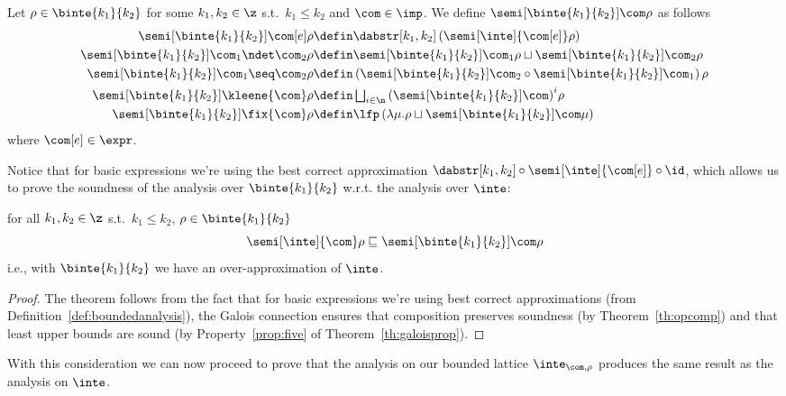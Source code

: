 \begin{definition}\label{def:boundedanalysis}
  Let \(\rho \in \binte{k_1}{k_2}\) for some \(k_1, k_2 \in \z\) s.t.\
  \(k_1 \leq k_2\) and \(\com \in \imp\). We define
  \(\semi[\binte{k_1}{k_2}]{\com}\rho\) as follows
  \begin{align*}
    \semi[\binte{k_1}{k_2}]{\com[e]}\rho & \defin \dabstr[k_1,k_2] \left(\semi[\inte]{\com[e]}\rho\right) \\
    \semi[\binte{k_1}{k_2}]{\com_1 \ndet \com_2}\rho & \defin \semi[\binte{k_1}{k_2}]{\com_1}\rho \sqcup \semi[\binte{k_1}{k_2}]{\com_2}\rho \\
    \semi[\binte{k_1}{k_2}]{\com_1 \seq \com_2}\rho & \defin \left(\semi[\binte{k_1}{k_2}]{\com_2} \circ \semi[\binte{k_1}{k_2}]{\com_1}\right)\rho \\
    \semi[\binte{k_1}{k_2}]{\kleene{\com}}\rho & \defin \textstyle\bigsqcup_{i\in\n}{\left({\semi[\binte{k_1}{k_2}]{\com}}\right)}^i\rho \\
    \semi[\binte{k_1}{k_2}]{\fix{\com}}\rho & \defin \lfp\left(\lambda \mu . \rho \sqcup \semi[\binte{k_1}{k_2}]{\com}\mu\right)
  \end{align*}
  where \(\com[e]\in\expr\). 
\end{definition}
\noindent
Notice that for basic expressions we're using the best correct
approximation
\(\dabstr[k_1,k_2] \circ \semi[\inte]{\com[e]} \circ \id\), which
allows us to prove the soundness of the analysis over
\(\binte{k_1}{k_2}\) w.r.t. the analysis over \(\inte\):
\begin{lemma}\label{le:leq}
  for all \(k_1, k_2\in\z\) s.t.\ \(k_1 \leq k_2\),
  \(\rho \in \binte{k_1}{k_2}\)
  \begin{equation*}
    \semi[\inte]{\com}\rho \sqsubseteq \semi[\binte{k_1}{k_2}]{\com}\rho
  \end{equation*}
  i.e., with \(\binte{k_1}{k_2}\) we have an over-approximation of \(\inte\).
\end{lemma}

\begin{proof}
  The theorem follows from the fact that for basic expressions we're
  using best correct approximations (from
  Definition~\ref{def:boundedanalysis}), the Galois connection ensures
  that composition preserves soundness (by Theorem~\ref{th:opcomp})
  and that least upper bounds are sound (by Property~\ref{prop:five}
  of Theorem~\ref{th:galoisprop}).
\end{proof}
With this consideration we can now proceed to prove that the analysis
on our bounded lattice \(\inte_{\com,\rho}\) produces the same result
as the analysis on \(\inte\).

